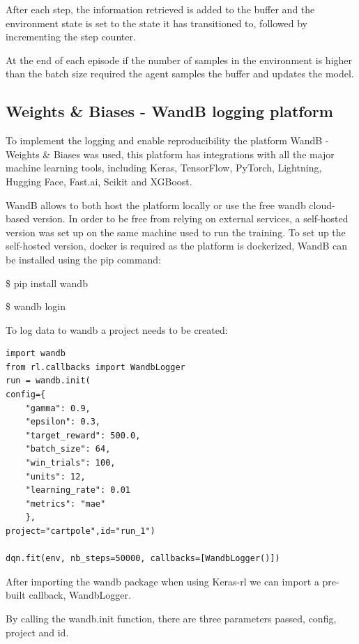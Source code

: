 After each step, the information retrieved is added to the buffer and the environment state is set to the state it has transitioned to, followed by incrementing the step counter.

At the end of each episode if the number of samples in the environment is higher than the batch size required the agent samples the buffer and updates the model.


\subsection*{Weights \& Biases - WandB logging platform}
To implement the logging and enable reproducibility the platform WandB - Weights \& Biases was used, this platform has integrations with all the major machine learning tools, including Keras, TensorFlow, PyTorch, Lightning, Hugging Face, Fast.ai, Scikit and XGBoost.\cite{wandb}

WandB allows to both host the platform locally or use the free wandb cloud-based version. In order to be free from relying on external services, a self-hosted version was set up on the same machine used to run the training.
To set up the self-hosted version, docker is required as the platform is dockerized, WandB can be installed using the pip command:

\begin{center}
\$ pip install wandb 

\$ wandb login
\end{center}

To log data to wandb a project needs to be created:

\lstset{language=Python}
\lstset{frame=lines}
\lstset{basicstyle=\footnotesize}
\begin{lstlisting}
import wandb
from rl.callbacks import WandbLogger
run = wandb.init(
config={
    "gamma": 0.9, 
    "epsilon": 0.3,
    "target_reward": 500.0,
    "batch_size": 64,
    "win_trials": 100,
    "units": 12,
    "learning_rate": 0.01
    "metrics": "mae"
    },
project="cartpole",id="run_1")

dqn.fit(env, nb_steps=50000, callbacks=[WandbLogger()])
\end{lstlisting}

After importing the wandb package when using Keras-rl we can import a pre-built callback, WandbLogger.

By calling the wandb.init function, there are three parameters passed, config, project and id.

